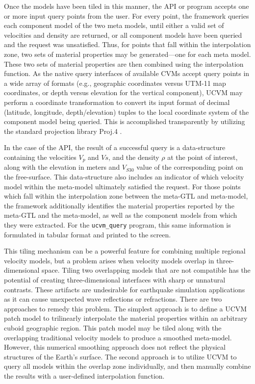 Once the models have been tiled in this manner, the API or program accepts one or more input query points from the user. For every point, the framework queries each component model of the two meta models, until either a valid set of velocities and density are returned, or all component models have been queried and the request was unsatisfied. Thus, for points that fall within the interpolation zone, two sets of material properties may be generated---one for each meta model. These two sets of material properties are then combined using the interpolation function. As the native query interfaces of available CVMs accept query points in a wide array of formats (e.g., geographic coordinates versus UTM-11 map coordinates, or depth versus elevation for the vertical component), UCVM may perform a coordinate transformation to convert its input format of decimal (latitude, longitude, depth/elevation) tuples to the local coordinate system of the component model being queried. This is accomplished transparently by utilizing the standard projection library Proj.4 \citep{Evenden_2003_Manual}.

In the case of the API, the result of a successful query is a data-structure containing the velocities $V_{p}$ and $V{s}$, and the density $\rho$ at the point of interest, along with the elevation in meters and $V_{S30}$ value of the corresponding point on the free-surface. This data-structure also includes an indicator of which velocity model within the meta-model ultimately satisfied the request. For those points which fall within the interpolation zone between the meta-GTL and meta-model, the framework additionally identifies the material properties reported by the meta-GTL and the meta-model, as well as the component models from which they were extracted. For the \texttt{ucvm\_query} program, this same information is formulated in tabular format and printed to the screen.

This tiling mechanism can be a powerful feature for combining multiple regional velocity models, but a problem arises when velocity models overlap in three-dimensional space. Tiling two overlapping models that are not compatible has the potential of creating three-dimensional interfaces with sharp or unnatural contrasts. These artifacts are undesirable for earthquake simulation applications as it can cause unexpected wave reflections or refractions. There are two approaches to remedy this problem. The simplest approach is to define a UCVM patch model to trilinearly interpolate the material properties within an arbitrary cuboid geographic region. This patch model may be tiled along with the overlapping traditional velocity models to produce a smoothed meta-model. However, this numerical smoothing approach does not reflect the physical structures of the Earth's surface. The second approach is to utilize UCVM to query all models within the overlap zone individually, and then manually combine the results with a user-defined interpolation function.

